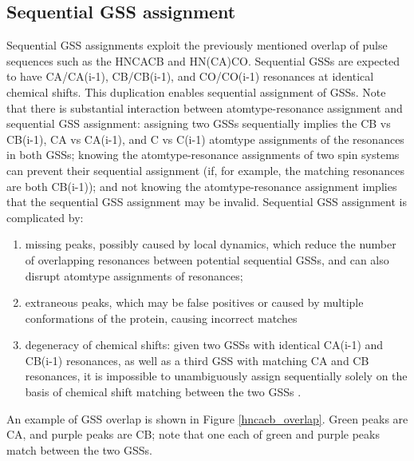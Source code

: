 \subsection{Sequential GSS assignment}
Sequential GSS assignments exploit the previously mentioned overlap of pulse
sequences such as the HNCACB and HN(CA)CO.  Sequential GSSs 
are expected to have CA/CA(i-1), CB/CB(i-1), and CO/CO(i-1) resonances at 
identical chemical shifts.  This duplication enables sequential assignment 
of GSSs.  Note that there is substantial interaction between atomtype-resonance 
assignment and sequential GSS assignment: assigning two GSSs sequentially 
implies the CB vs CB(i-1), CA vs CA(i-1), and C vs C(i-1) atomtype assignments 
of the resonances in both GSSs; knowing the atomtype-resonance assignments of 
two spin systems can prevent their sequential assignment (if, for example, the 
matching resonances are both CB(i-1)); and not knowing the atomtype-resonance 
assignment implies that the sequential GSS assignment may be invalid.  
Sequential GSS assignment is complicated by: 
\begin{enumerate}
  \item missing peaks, possibly caused 
  by local dynamics, which reduce the number of overlapping resonances between 
  potential sequential GSSs, and can also disrupt atomtype assignments of 
  resonances; 
  \item extraneous peaks, which may be false positives or caused by 
  multiple conformations of the protein, causing incorrect matches
  \item degeneracy of chemical shifts:  given two GSSs with identical CA(i-1) 
  and CB(i-1) resonances, as well as a third GSS with matching CA and CB 
  resonances, it is impossible to unambiguously assign sequentially solely 
  on the basis of chemical shift matching between the two GSSs 
  \cite{autoassign1997}.
\end{enumerate}

An example of GSS overlap is shown in Figure \ref{hncacb_overlap}.  Green peaks
are CA, and purple peaks are CB; note that one each of green and purple peaks
match between the two GSSs.

